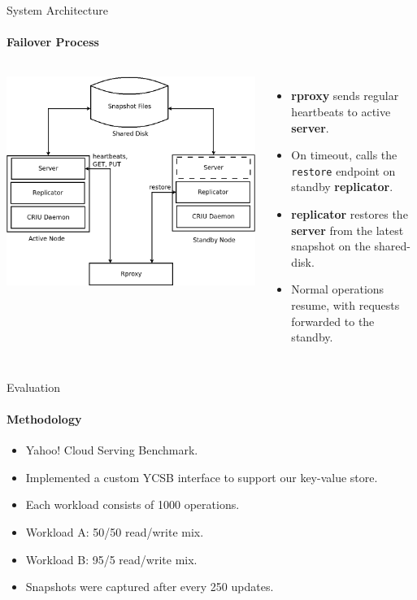 \documentclass{beamer}
\begin{document}
\begin{frame}{System Architecture}
  \framesubtitle{Failover Process}

  \begin{columns}
    \includegraphics[scale=0.15]{../paper/arch}

    \begin{itemize}
      \item \textbf{rproxy} sends regular heartbeats to active \textbf{server}.
      \pause \item On timeout, calls the \texttt{restore} endpoint on standby \textbf{replicator}.
      \pause \item \textbf{replicator} restores the \textbf{server} from the latest snapshot on the shared-disk.
      \pause \item Normal operations resume, with requests forwarded to the standby.
    \end{itemize}
  \end{columns}
\end{frame}

\begin{frame}{Evaluation}
  \framesubtitle{Methodology}

  \begin{itemize}
    \item Yahoo! Cloud Serving Benchmark.
    \item Implemented a custom YCSB interface to support our key-value store.
    \item Each workload consists of 1000 operations.
    \item Workload A: 50/50 read/write mix.
    \item Workload B: 95/5 read/write mix.
    \item Snapshots were captured after every 250 updates.
  \end{itemize}
\end{frame}
\end{document}
